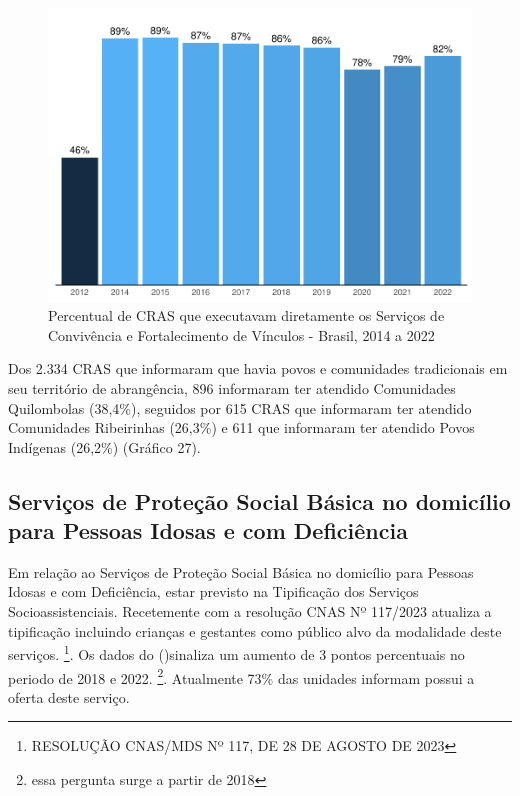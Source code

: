 \documentclass[
  brazilian]{report}
\begin{document}
\begin{figure}
\includegraphics{Censo-SUAS-2022_files/figure-latex/CRAS-SCFV-1} \caption[Percentual de CRAS que executavam diretamente os Serviços de Convivência e Fortalecimento de Vínculos - Brasil, 2014 a 2022]{Percentual de CRAS que executavam diretamente os Serviços de Convivência e Fortalecimento de Vínculos - Brasil, 2014 a 2022}\label{fig:CRAS-SCFV}
\end{figure}

Dos 2.334 CRAS que informaram que havia povos e comunidades tradicionais
em seu território de abrangência, 896 informaram ter atendido
Comunidades Quilombolas (38,4\%), seguidos por 615 CRAS que informaram
ter atendido Comunidades Ribeirinhas (26,3\%) e 611 que informaram ter
atendido Povos Indígenas (26,2\%) (Gráfico 27).

\hypertarget{serviuxe7os-de-proteuxe7uxe3o-social-buxe1sica-no-domicuxedlio-para-pessoas-idosas-e-com-deficiuxeancia}{%
\subsection{Serviços de Proteção Social Básica no domicílio para Pessoas
Idosas e com
Deficiência}\label{serviuxe7os-de-proteuxe7uxe3o-social-buxe1sica-no-domicuxedlio-para-pessoas-idosas-e-com-deficiuxeancia}}

Em relação ao Serviços de Proteção Social Básica no domicílio para
Pessoas Idosas e com Deficiência, estar previsto na Tipificação dos
Serviços Socioassistenciais. Recetemente com a resolução CNAS Nº
117/2023 atualiza a tipificação incluindo crianças e gestantes como
público alvo da modalidade deste serviços.
\footnote{RESOLUÇÃO CNAS/MDS Nº 117, DE 28 DE AGOSTO DE 2023}. Os dados
do ()sinaliza um aumento de 3 pontos percentuais no
periodo de 2018 e 2022. \footnote{essa pergunta surge a partir de 2018}.
Atualmente 73\% das unidades informam possui a oferta deste serviço.
\end{document}
